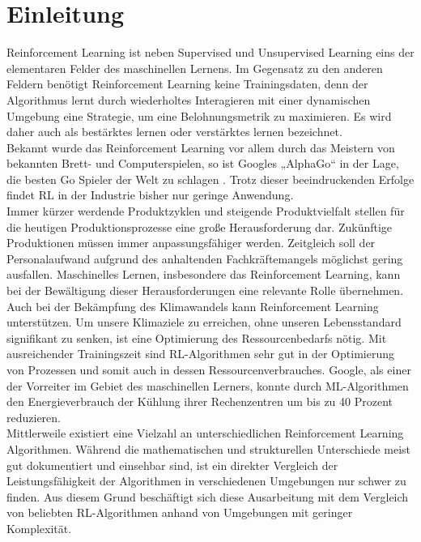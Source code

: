 \section{Einleitung}
Reinforcement Learning ist neben Supervised und Unsupervised Learning eins der elementaren Felder des maschinellen Lernens. 
Im Gegensatz zu den anderen Feldern benötigt Reinforcement Learning keine Trainingsdaten, 
denn der Algorithmus lernt durch wiederholtes Interagieren mit einer dynamischen Umgebung eine Strategie, 
um eine Belohnungsmetrik zu maximieren. Es wird daher auch als bestärktes lernen oder verstärktes lernen bezeichnet.\\

Bekannt wurde das Reinforcement Learning vor allem durch das Meistern von bekannten Brett- und Computerspielen, 
so ist Googles „AlphaGo“ in der Lage, die besten Go Spieler der Welt zu schlagen \cite{v7labsReinforcementLearning}. 
Trotz dieser beeindruckenden Erfolge findet RL in der Industrie bisher nur geringe Anwendung.\\  

Immer kürzer werdende Produktzyklen und steigende Produktvielfalt stellen für die heutigen Produktionsprozesse eine große Herausforderung dar.
Zukünftige Produktionen müssen immer anpassungsfähiger werden. 
Zeitgleich soll der Personalaufwand aufgrund des anhaltenden Fachkräftemangels möglichst gering ausfallen. 
Maschinelles Lernen, insbesondere das Reinforcement Learning,
kann bei der Bewältigung dieser Herausforderungen eine relevante Rolle übernehmen.\\

Auch bei der Bekämpfung des Klimawandels kann Reinforcement Learning unterstützen. 
Um unsere Klimaziele zu erreichen, ohne unseren Lebensstandard signifikant zu senken, 
ist eine Optimierung des Ressourcenbedarfs nötig. 
Mit ausreichender Trainingszeit sind RL-Algorithmen sehr gut in der Optimierung von Prozessen und 
somit auch in dessen Ressourcenverbrauches. Google, als einer der Vorreiter im Gebiet des maschinellen Lerners, 
konnte durch ML-Algorithmen den Energieverbrauch der Kühlung ihrer Rechenzentren um bis zu 40 Prozent reduzieren\cite{v7labsReinforcementLearning}.\\

Mittlerweile existiert eine Vielzahl an unterschiedlichen Reinforcement Learning Algorithmen. 
Während die mathematischen und strukturellen Unterschiede meist gut dokumentiert und einsehbar sind, 
ist ein direkter Vergleich der Leistungsfähigkeit der Algorithmen in verschiedenen Umgebungen nur schwer zu finden. 
Aus diesem Grund beschäftigt sich diese Ausarbeitung mit dem Vergleich von beliebten RL-Algorithmen anhand von Umgebungen mit geringer Komplexität.\\

